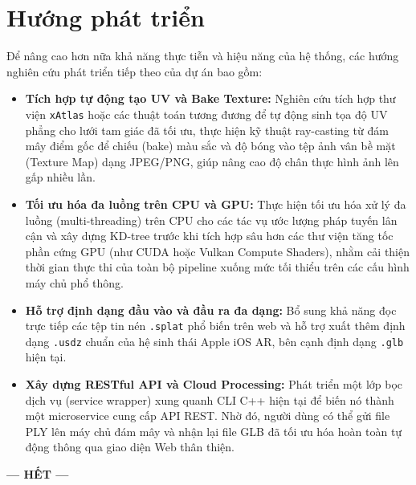 \documentclass[a4paper,12pt]{report}
\begin{document}
\section{Hướng phát triển}
Để nâng cao hơn nữa khả năng thực tiễn và hiệu năng của hệ thống, các hướng nghiên cứu phát triển tiếp theo của dự án bao gồm:
\begin{itemize}
    \item \textbf{Tích hợp tự động tạo UV và Bake Texture:} Nghiên cứu tích hợp thư viện \texttt{xAtlas} hoặc các thuật toán tương đương để tự động sinh tọa độ UV phẳng cho lưới tam giác đã tối ưu, thực hiện kỹ thuật ray-casting từ đám mây điểm gốc để chiếu (bake) màu sắc và độ bóng vào tệp ảnh vân bề mặt (Texture Map) dạng JPEG/PNG, giúp nâng cao độ chân thực hình ảnh lên gấp nhiều lần.
    \item \textbf{Tối ưu hóa đa luồng trên CPU và GPU:} Thực hiện tối ưu hóa xử lý đa luồng (multi-threading) trên CPU cho các tác vụ ước lượng pháp tuyến lân cận và xây dựng KD-tree trước khi tích hợp sâu hơn các thư viện tăng tốc phần cứng GPU (như CUDA hoặc Vulkan Compute Shaders), nhằm cải thiện thời gian thực thi của toàn bộ pipeline xuống mức tối thiểu trên các cấu hình máy chủ phổ thông.
    \item \textbf{Hỗ trợ định dạng đầu vào và đầu ra đa dạng:} Bổ sung khả năng đọc trực tiếp các tệp tin nén \texttt{.splat} phổ biến trên web và hỗ trợ xuất thêm định dạng \texttt{.usdz} chuẩn của hệ sinh thái Apple iOS AR, bên cạnh định dạng \texttt{.glb} hiện tại.
    \item \textbf{Xây dựng RESTful API và Cloud Processing:} Phát triển một lớp bọc dịch vụ (service wrapper) xung quanh CLI C++ hiện tại để biến nó thành một microservice cung cấp API REST. Nhờ đó, người dùng có thể gửi file PLY lên máy chủ đám mây và nhận lại file GLB đã tối ưu hóa hoàn toàn tự động thông qua giao diện Web thân thiện.
\end{itemize}

\vspace{0.5cm}
\begin{center}
\vfill
\centering
\textbf{\color{ViettelRed}--- HẾT ---}
\end{center}
\end{document}
